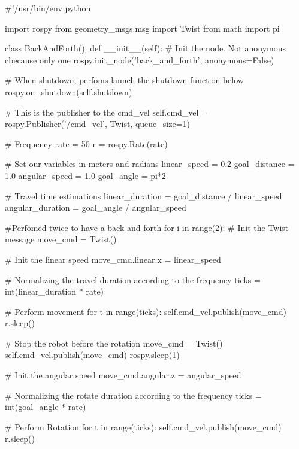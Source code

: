 \documentclass[aps,letterpaper,11pt]{revtex4}
\begin{document}
\begin{python}
#!/usr/bin/env python

import rospy
from geometry_msgs.msg import Twist
from math import pi

class BackAndForth():
    def __init__(self):
        # Init the node. Not anonymous cbecause only one 
        rospy.init_node('back_and_forth', anonymous=False)

        # When shutdown, perfoms launch the shutdown function below      
        rospy.on_shutdown(self.shutdown)
        
        # This is the publisher to the cmd_vel
        self.cmd_vel = rospy.Publisher('/cmd_vel', Twist, queue_size=1)
        
        # Frequency
        rate = 50
        r = rospy.Rate(rate)
        
        # Set our variables in meters and radians
        linear_speed = 0.2
        goal_distance = 1.0
        angular_speed = 1.0
        goal_angle = pi*2
        
        # Travel time estimations
        linear_duration = goal_distance / linear_speed
        angular_duration = goal_angle / angular_speed
        
        #Perfomed twice to have a back and forth
        for i in range(2):
            # Init the Twist message
            move_cmd = Twist()
            
            # Init the linear speed
            move_cmd.linear.x = linear_speed
            
            # Normalizing the travel duration according to the frequency
            ticks = int(linear_duration * rate)
            
            # Perform movement
            for t in range(ticks):
                self.cmd_vel.publish(move_cmd)
                r.sleep()
            
            # Stop the robot before the rotation
            move_cmd = Twist()
            self.cmd_vel.publish(move_cmd)
            rospy.sleep(1)
            
            # Init the angular speed
            move_cmd.angular.z = angular_speed

            # Normalizing the rotate duration according to the frequency
            ticks = int(goal_angle * rate)
            
            # Perform Rotation
            for t in range(ticks):           
                self.cmd_vel.publish(move_cmd)
                r.sleep()
                

\end{python}
\end{document}
